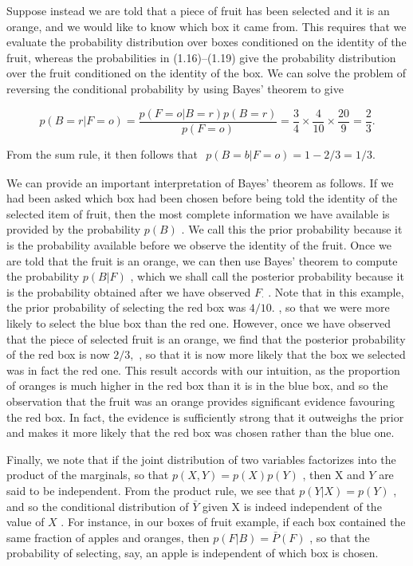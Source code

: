\documentclass[
  10
]{article}
\begin{document}
Suppose instead we are told that a piece of fruit has been selected and
it is an orange, and we would like to know which box it came from. This
requires that we evaluate the probability distribution over boxes
conditioned on the identity of the fruit, whereas the probabilities in
(1.16)--(1.19) give the probability distribution over the fruit
conditioned on the identity of the box. We can solve the problem of
reversing the conditional probability by using Bayes' theorem to give

\[
p (B = r | F = o) = \frac {p (F = o | B = r) p (B = r)}{p (F = o)} = \frac {3}{4} \times \frac {4}{1 0} \times \frac {2 0}{9} = \frac {2}{3}.\tag{1.23}
\]

From the sum rule, it then follows that
\(\begin{array} { r } { p ( B = b | F = o ) = 1 - 2 / 3 = 1 / 3 . } \end{array}\)

We can provide an important interpretation of Bayes' theorem as follows.
If we had been asked which box had been chosen before being told the
identity of the selected item of fruit, then the most complete
information we have available is provided by the probability \(p ( B )\)
. We call this the prior probability because it is the probability
available before we observe the identity of the fruit. Once we are told
that the fruit is an orange, we can then use Bayes' theorem to compute
the probability \(p ( B | F )\) , which we shall call the posterior
probability because it is the probability obtained after we have
observed \(F _ { \cdot }\) . Note that in this example, the prior
probability of selecting the red box was \(4 / 1 0 .\) , so that we were
more likely to select the blue box than the red one. However, once we
have observed that the piece of selected fruit is an orange, we find
that the posterior probability of the red box is now \(2 / 3 ,\) , so
that it is now more likely that the box we selected was in fact the red
one. This result accords with our intuition, as the proportion of
oranges is much higher in the red box than it is in the blue box, and so
the observation that the fruit was an orange provides significant
evidence favouring the red box. In fact, the evidence is sufficiently
strong that it outweighs the prior and makes it more likely that the red
box was chosen rather than the blue one.

Finally, we note that if the joint distribution of two variables
factorizes into the product of the marginals, so that
\(p ( X , Y ) = p ( X ) p ( Y )\) , then X and \(Y\) are said to be
independent. From the product rule, we see that
\(p ( Y | X ) = p ( Y )\) , and so the conditional distribution of
\(\bar { Y }\) given X is indeed independent of the value of \(X\) . For
instance, in our boxes of fruit example, if each box contained the same
fraction of apples and oranges, then \(p ( F | B ) = \bar { P } ( F )\)
, so that the probability of selecting, say, an apple is independent of
which box is chosen.
\end{document}
